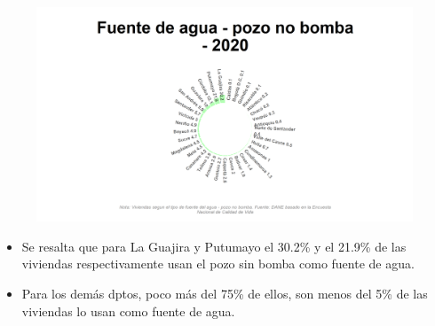     \begin{figure}[H]
        \caption[Pozo sin bomba como fuentes de agua por departamentos para 2020 ]{\label{pozo_no_bomba_dptos} }
        \begin{center}
        \includegraphics[width=\textwidth,keepaspectratio]{img/var_137_static.png}
        \end{center}
    \end{figure}
            \begin{itemize}
                    \item Se resalta que para La Guajira y Putumayo el 30.2\% y el 21.9\% de las viviendas respectivamente usan el pozo sin bomba como fuente de agua.
                    \item Para los demás dptos, poco más del 75\% de ellos, son menos del 5\% de las viviendas lo usan como fuente de agua.
                    \end{itemize}

